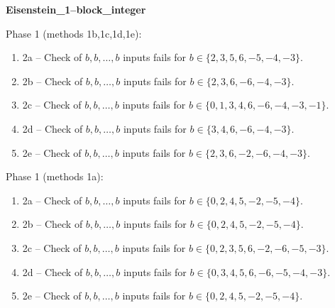 \begin{exmp}
\label{ex:compareAB}

\textbf{Eisenstein\_1--block\_integer}

Phase 1 (methods 1b,\allowbreak  1c,\allowbreak  1d,\allowbreak  1e):
\begin{enumerate}[ ]
\item  2a -- Check of $b,\allowbreak b,\allowbreak \dots,\allowbreak b$ inputs fails for $b\in \{2,\allowbreak  3,\allowbreak  5,\allowbreak  6,\allowbreak  -5,\allowbreak  -4,\allowbreak  -3\}$.
\item  2b -- Check of $b,\allowbreak b,\allowbreak \dots,\allowbreak b$ inputs fails for $b\in \{2,\allowbreak  3,\allowbreak  6,\allowbreak  -6,\allowbreak  -4,\allowbreak  -3\}$.
\item  2c -- Check of $b,\allowbreak b,\allowbreak \dots,\allowbreak b$ inputs fails for $b\in \{0,\allowbreak  1,\allowbreak  3,\allowbreak  4,\allowbreak  6,\allowbreak  -6,\allowbreak  -4,\allowbreak  -3,\allowbreak  -1\}$.
\item  2d -- Check of $b,\allowbreak b,\allowbreak \dots,\allowbreak b$ inputs fails for $b\in \{3,\allowbreak  4,\allowbreak  6,\allowbreak  -6,\allowbreak  -4,\allowbreak  -3\}$.
\item  2e -- Check of $b,\allowbreak b,\allowbreak \dots,\allowbreak b$ inputs fails for $b\in \{2,\allowbreak  3,\allowbreak  6,\allowbreak  -2,\allowbreak  -6,\allowbreak  -4,\allowbreak  -3\}$.
\end{enumerate}


Phase 1 (methods 1a):
\begin{enumerate}[ ]
\item  2a -- Check of $b,\allowbreak b,\allowbreak \dots,\allowbreak b$ inputs fails for $b\in \{0,\allowbreak  2,\allowbreak  4,\allowbreak  5,\allowbreak  -2,\allowbreak  -5,\allowbreak  -4\}$.
\item  2b -- Check of $b,\allowbreak b,\allowbreak \dots,\allowbreak b$ inputs fails for $b\in \{0,\allowbreak  2,\allowbreak  4,\allowbreak  5,\allowbreak  -2,\allowbreak  -5,\allowbreak  -4\}$.
\item  2c -- Check of $b,\allowbreak b,\allowbreak \dots,\allowbreak b$ inputs fails for $b\in \{0,\allowbreak  2,\allowbreak  3,\allowbreak  5,\allowbreak  6,\allowbreak  -2,\allowbreak  -6,\allowbreak  -5,\allowbreak  -3\}$.
\item  2d -- Check of $b,\allowbreak b,\allowbreak \dots,\allowbreak b$ inputs fails for $b\in \{0,\allowbreak  3,\allowbreak  4,\allowbreak  5,\allowbreak  6,\allowbreak  -6,\allowbreak  -5,\allowbreak  -4,\allowbreak  -3\}$.
\item  2e -- Check of $b,\allowbreak b,\allowbreak \dots,\allowbreak b$ inputs fails for $b\in \{0,\allowbreak  2,\allowbreak  4,\allowbreak  5,\allowbreak  -2,\allowbreak  -5,\allowbreak  -4\}$.
\end{enumerate}


\end{exmp}




